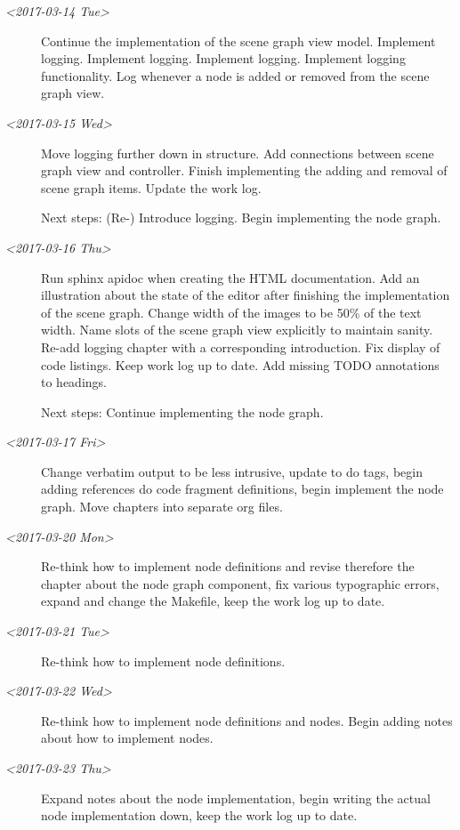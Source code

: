 \documentclass[10pt, openright, notitlepage]{scrreprt}
\begin{document}
\begin{description}
\item[{\textit{<2017-03-14 Tue>}}] Continue the implementation of the scene graph view model.
Implement logging. Implement logging. Implement logging. Implement logging
functionality. Log whenever a node is added or removed from the scene graph
view.

\item[{\textit{<2017-03-15 Wed>}}] Move logging further down in structure. Add connections
between scene graph view and controller. Finish implementing the adding and
removal of scene graph items. Update the work log.

Next steps: (Re-) Introduce logging. Begin implementing the node graph.

\item[{\textit{<2017-03-16 Thu>}}] Run sphinx apidoc when creating the HTML documentation.
Add an illustration about the state of the editor after finishing the
implementation of the scene graph. Change width of the images to be 50\% of
the text width. Name slots of the scene graph view explicitly to maintain
sanity. Re-add logging chapter with a corresponding introduction. Fix display
of code listings. Keep work log up to date. Add missing TODO annotations to
headings.

Next steps: Continue implementing the node graph.

\item[{\textit{<2017-03-17 Fri>}}] Change verbatim output to be less intrusive, update to do
tags, begin adding references do code fragment definitions, begin implement
the node graph. Move chapters into separate org files.

\item[{\textit{<2017-03-20 Mon>}}] Re-think how to implement node definitions and revise
therefore the chapter about the node graph component, fix various
typographic errors, expand and change the Makefile, keep the work log up
to date.

\item[{\textit{<2017-03-21 Tue>}}] Re-think how to implement node definitions.

\item[{\textit{<2017-03-22 Wed>}}] Re-think how to implement node definitions and nodes. Begin adding
notes about how to implement nodes.

\item[{\textit{<2017-03-23 Thu>}}] Expand notes about the node implementation, begin writing
the actual node implementation down, keep the work log up to date.
\end{description}
\end{document}
